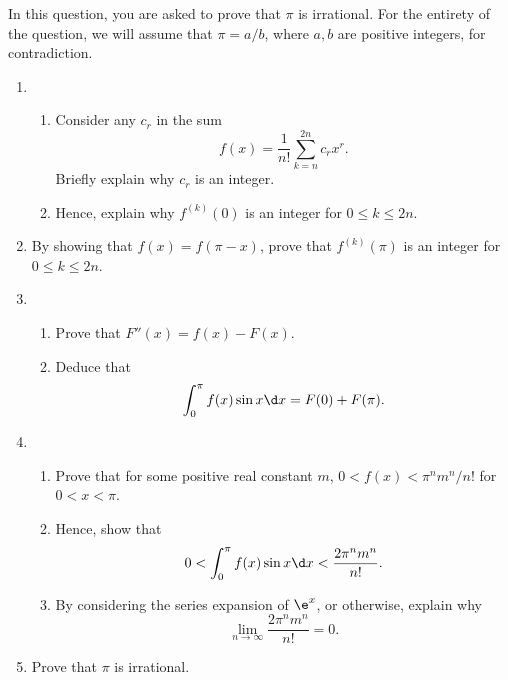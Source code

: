 \begin{problem}
    \separator

    In this question, you are asked to prove that $\pi$ is irrational. For the entirety of the question, we will assume that $\pi = a/b$, where $a, b$ are positive integers, for contradiction.

    \begin{enumerate}
        \item \begin{enumerate}
            \item Consider any $c_r$ in the sum \[f(x) = \frac1{n!} \sum_{k = n}^{2n} c_r x^r.\] Briefly explain why $c_r$ is an integer.
            \item Hence, explain why $f^{(k)}(0)$ is an integer for $0 \leq k \leq 2n$.
        \end{enumerate}
        \item By showing that $f(x) = f(\pi - x)$, prove that $f^{(k)}(\pi)$ is an integer for $0 \leq k \leq 2n$.
        \item \begin{enumerate}
            \item Prove that $F''(x) = f(x) - F(x)$.
            \item Deduce that \[\int_0^\pi f(x) \sin x \d x = F(0) + F(\pi).\]
        \end{enumerate}
        \item \begin{enumerate}
            \item Prove that for some positive real constant $m$, $0 < f(x) < \pi^n m^n / n!$ for $0 < x < \pi$.
            \item Hence, show that \[0 < \int_0^\pi f(x) \sin x \d x < \frac{2\pi^n m^n}{n!}.\]
            \item By considering the series expansion of $\e^x$, or otherwise, explain why \[\lim_{n \to \infty} \frac{2\pi^n m^n}{n!} = 0.\]
        \end{enumerate}
        \item Prove that $\pi$ is irrational.
    \end{enumerate}
\end{problem}
